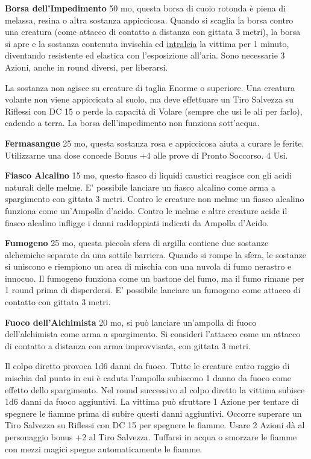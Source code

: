 \begin{multicols}{2}
\textbf{Borsa dell'Impedimento} 50 mo, questa borsa di cuoio rotonda è piena di melassa, resina o altra sostanza appiccicosa. Quando si scaglia la borsa contro una creatura (come attacco di contatto a distanza con gittata 3 metri), la borsa si apre e la sostanza contenuta invischia ed \hyperlink{intralciato}{intralcia} la vittima per 1 minuto, diventando resistente ed elastica con l'esposizione all'aria. Sono necessarie 3 Azioni, anche in round diversi, per liberarsi.

La sostanza non agisce su creature di taglia Enorme o superiore. Una creatura volante non viene appiccicata al suolo, ma deve effettuare un Tiro Salvezza su Riflessi con DC 15 o perde la capacità di Volare (sempre che usi le ali per farlo), cadendo a terra. La borsa dell'impedimento non funziona sott'acqua.

\textbf{Fermasangue}\hypertarget{Fermasangue}{}\label{fermasangue} 25 mo, questa sostanza rosa e appiccicosa aiuta a curare le ferite. Utilizzarne una dose concede Bonus +4 alle prove di Pronto Soccorso. 4 Usi.

\textbf{Fiasco Alcalino} 15 mo, questo fiasco di liquidi caustici reagisce con gli acidi naturali delle melme. E' possibile lanciare un fiasco alcalino come arma a spargimento con gittata 3 metri. Contro le creature non melme un fiasco alcalino funziona come un'Ampolla d'acido. Contro le melme e altre creature acide il fiasco alcalino infligge i danni raddoppiati indicati da Ampolla d'Acido.

\textbf{Fumogeno} 25 mo, questa piccola sfera di argilla contiene due sostanze alchemiche separate da una sottile barriera. Quando si rompe la sfera, le sostanze si uniscono e riempiono un area di mischia con una nuvola di fumo nerastro e innocuo. Il fumogeno funziona come un bastone del fumo, ma il fumo rimane per 1 round prima di disperdersi. E' possibile lanciare un fumogeno come attacco di contatto con gittata 3 metri.

\textbf{Fuoco dell'Alchimista}\hypertarget{Fuoco dell'Alchimista}{} 20 mo, si può lanciare un'ampolla di fuoco dell'alchimista come arma a spargimento. Si consideri l'attacco come un attacco di contatto a distanza con arma improvvisata, con gittata 3 metri.

Il colpo diretto provoca 1d6 danni da fuoco. Tutte le creature entro raggio di mischia dal punto in cui è caduta l'ampolla subiscono 1 danno da fuoco come effetto dello spargimento. Nel round successivo al colpo diretto la vittima subisce 1d6 danni da fuoco aggiuntivi. La vittima può sfruttare 1 Azione per tentare di spegnere le fiamme prima di subire questi danni aggiuntivi. Occorre superare un Tiro Salvezza su Riflessi con DC 15 per spegnere le fiamme. Usare 2 Azioni dà al personaggio bonus +2 al Tiro Salvezza. Tuffarsi in acqua o smorzare le fiamme con mezzi magici spegne automaticamente le fiamme.


\end{multicols}
